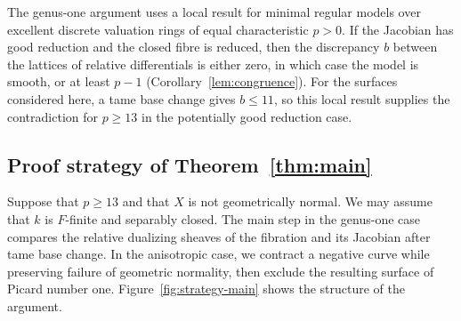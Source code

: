 The genus-one argument uses a local result for minimal regular models over excellent discrete valuation rings of equal characteristic $p>0$.
If the Jacobian has good reduction and the closed fibre is reduced, then the discrepancy $b$ between the lattices of relative differentials is either zero, in which case the model is smooth, or at least $p-1$ (Corollary~\ref{lem:congruence}).
For the surfaces considered here, a tame base change gives $b\leq 11$, so this local result supplies the contradiction for $p\geq 13$ in the potentially good reduction case.

\subsection{Proof strategy of Theorem~\ref{thm:main}}

Suppose that $p\geq 13$ and that $X$ is not geometrically normal.
We may assume that $k$ is $F$-finite and separably closed.
The main step in the genus-one case compares the relative dualizing sheaves of the fibration and its Jacobian after tame base change.
In the anisotropic case, we contract a negative curve while preserving failure of geometric normality, then exclude the resulting surface of Picard number one.
Figure~\ref{fig:strategy-main} shows the structure of the argument.

